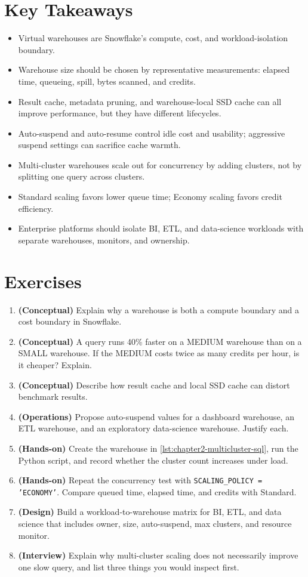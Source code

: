 \section*{Key Takeaways}
\begin{itemize}
    \item Virtual warehouses are Snowflake's compute, cost, and workload-isolation boundary.
    \item Warehouse size should be chosen by representative measurements: elapsed time, queueing, spill, bytes scanned, and credits.
    \item Result cache, metadata pruning, and warehouse-local SSD cache can all improve performance, but they have different lifecycles.
    \item Auto-suspend and auto-resume control idle cost and usability; aggressive suspend settings can sacrifice cache warmth.
    \item Multi-cluster warehouses scale out for concurrency by adding clusters, not by splitting one query across clusters.
    \item Standard scaling favors lower queue time; Economy scaling favors credit efficiency.
    \item Enterprise platforms should isolate BI, ETL, and data-science workloads with separate warehouses, monitors, and ownership.
\end{itemize}

\section{Exercises}
\begin{enumerate}
    \item \textbf{(Conceptual)} Explain why a warehouse is both a compute boundary and a cost boundary in Snowflake.
    \item \textbf{(Conceptual)} A query runs 40\% faster on a MEDIUM warehouse than on a SMALL warehouse. If the MEDIUM costs twice as many credits per hour, is it cheaper? Explain.
    \item \textbf{(Conceptual)} Describe how result cache and local SSD cache can distort benchmark results.
    \item \textbf{(Operations)} Propose auto-suspend values for a dashboard warehouse, an ETL warehouse, and an exploratory data-science warehouse. Justify each.
    \item \textbf{(Hands-on)} Create the warehouse in \cref{lst:chapter2-multicluster-sql}, run the Python script, and record whether the cluster count increases under load.
    \item \textbf{(Hands-on)} Repeat the concurrency test with \texttt{SCALING\_POLICY = 'ECONOMY'}. Compare queued time, elapsed time, and credits with Standard.
    \item \textbf{(Design)} Build a workload-to-warehouse matrix for BI, ETL, and data science that includes owner, size, auto-suspend, max clusters, and resource monitor.
    \item \textbf{(Interview)} Explain why multi-cluster scaling does not necessarily improve one slow query, and list three things you would inspect first.
\end{enumerate}

